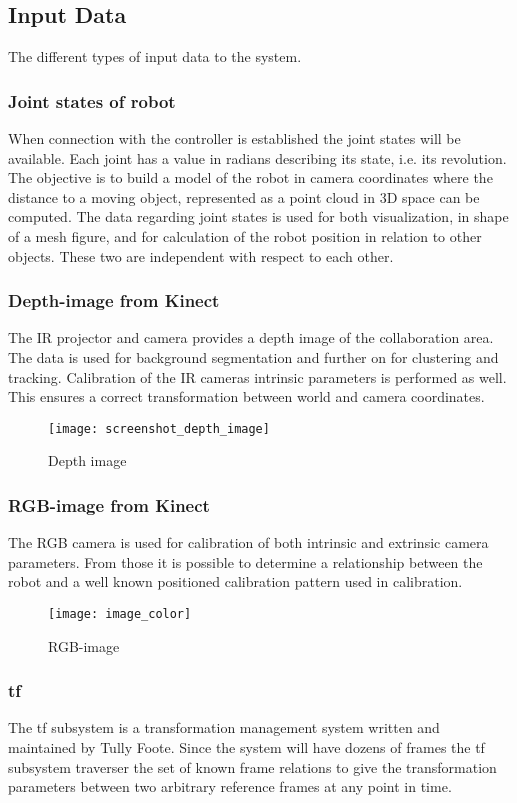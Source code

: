 \subsection{Input Data}
The different types of input data to the system.
\subsubsection{Joint states of robot}
When connection with the controller is established the joint states will be available. Each joint has a value in radians describing its state, i.e. its revolution. The objective is to build a model of the robot in camera coordinates where the distance to a moving object, represented as a point cloud in 3D space can be computed.
The data regarding joint states is used for both visualization, in shape of a mesh figure, and for calculation of the robot position in relation to other objects. These two are independent with respect to each other.

\subsubsection{Depth-image from Kinect}
The IR projector and camera provides a depth image of the collaboration area. The data is used for background segmentation and further on for clustering and tracking. Calibration of the IR cameras intrinsic parameters is performed as well. This ensures a correct transformation between world and camera coordinates.

\begin{figure}[H]
\begin{center}
\texttt{[image: screenshot\_depth\_image]}
\caption{Depth image}

\end{center}
\end{figure}

\subsubsection{RGB-image from Kinect}
The RGB camera is used for calibration of both intrinsic and extrinsic camera parameters. From those it is possible to determine a relationship between the robot and a well known positioned calibration pattern used in calibration. 

\begin{figure}[H]
\begin{center}
\texttt{[image: image\_color]}
\caption{RGB-image}

\end{center}
\end{figure}

\subsubsection{tf}
The tf subsystem is a transformation management system written and maintained by Tully Foote. Since the system will have dozens of frames the tf subsystem traverser the set of known frame relations to give the transformation parameters between two arbitrary reference frames at any point in time. 